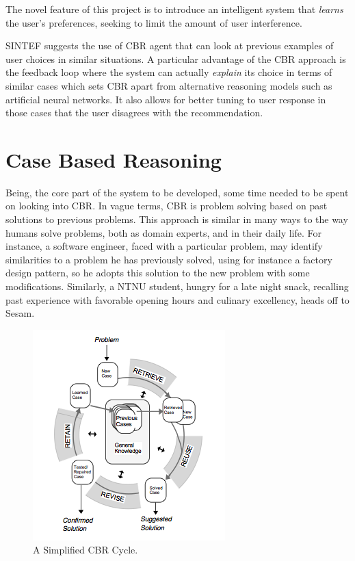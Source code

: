 The novel feature of this project is to introduce an intelligent system that \emph{learns} the user's preferences, seeking to limit the amount of user interference.

SINTEF suggests the use of CBR agent that can look at previous examples of user choices in similar situations. A particular advantage of the CBR approach is the feedback loop where the system can actually \emph{explain} its choice in terms of similar cases which sets CBR apart from alternative reasoning models such as artificial neural networks. It also allows for better tuning to user response in those cases that the user disagrees with the recommendation.

\section{Case Based Reasoning}
Being, the core part of the system to be developed, some time needed to be spent on looking into CBR. In vague terms, CBR is problem solving based on past solutions to previous problems. This approach is similar in many ways to the way humans solve problems, both as domain experts, and in their daily life. For instance, a software engineer, faced with a particular problem, may identify similarities to a problem he has previously solved, using for instance a factory design pattern, so he adopts this solution to the new problem with some modifications. Similarly, a NTNU student, hungry for a late night snack, recalling past experience with favorable opening hours and culinary excellency, heads off to Sesam.

\begin{figure}[htbp]
\begin{center}
\includegraphics[width = .6\textwidth]{PrelimStudy/cbrCycle}
\caption{A Simplified CBR Cycle.}
\label{cbrCycle}
\end{center}
\end{figure}


